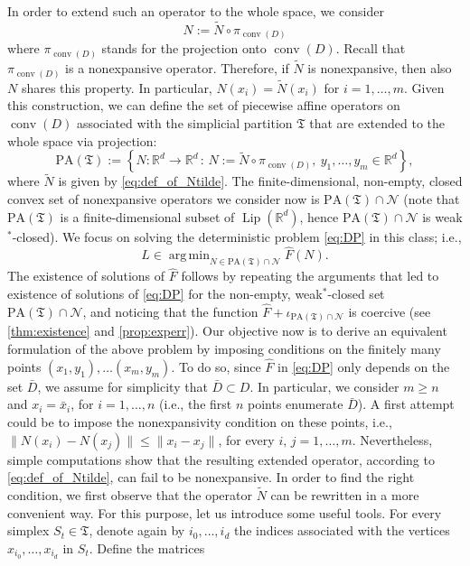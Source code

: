 \documentclass[onefignum,onetabnum]{siamonline250211}
\newcommand{\Lip}{\operatorname{Lip}}
\newcommand{\N}{\mathcal{N}}
\newcommand{\R}{\mathbb{R}}
\newcommand{\conv}{\operatorname{conv}}
\DeclareMathOperator*{\argmin}{arg\,min}
\begin{document}
In order to extend such an operator to the whole space, we consider
$$
N:=\tilde{N}\circ \pi_{\conv(D)}
$$
where $\pi_{\conv(D)}$ stands for the projection onto $\conv(D)$. Recall that $\pi_{\conv(D)}$ is a nonexpansive operator. Therefore, if $\tilde{N}$ is nonexpansive, then also $N$ shares this property. In particular, $N(x_i)=\tilde N (x_i)$ for $i=1,\dots, m$. Given this construction, we can define the set of piecewise affine operators on $\conv(D)$ associated with the simplicial partition $\mathfrak{T}$ that are extended to the whole space via projection:
$$
\mathrm{PA}(\mathfrak{T}):=\left\{N:\R^d\to\R^d  \, : \,  N:=\tilde{N}\circ \pi_{\conv(D)}, \ y_1, \ldots, y_m\in\R^d\right\},
$$
where $\tilde{N}$ is given by \cref{eq:def_of_Ntilde}. The finite-dimensional, non-empty, closed convex set of nonexpansive operators we consider now is $\mathrm{PA}(\mathfrak{T}) \cap \N$ (note that $\mathrm{PA}(\mathfrak{T})$ is a finite-dimensional subset of $\Lip(\R^d)$, hence $\mathrm{PA}(\mathfrak{T}) \cap \N$ is weak$^*$-closed). We focus on solving the deterministic problem \cref{eq:DP} in this class; i.e.,
\begin{equation}\label{eq:PAP}
\tag{PAP}
\widehat{L}\in\argmin_{N\in\mathrm{PA}(\mathfrak{T})\cap\N}\widehat{F}(N).
\end{equation}
The existence of solutions of $\widehat{F}$ follows by repeating the arguments that led to existence of solutions of \cref{eq:DP} for the non-empty, weak$^*$-closed set $\mathrm{PA}(\mathfrak{T}) \cap \N$, and noticing that the function $\widehat{F}+\iota_{\mathrm{PA}(\mathfrak{T})\cap\N}$ is coercive (see \cref{thm:existence} and \cref{prop:experr}). Our objective now is to derive an equivalent formulation of the above problem by imposing conditions on the finitely many points $(x_1, y_1), \ldots (x_m, y_m)$. To do so, since $\widehat{F}$ in \cref{eq:DP} only depends on the set $\bar{D}$, we assume for simplicity that $\bar D\subset D$. In particular, we consider $m \geq n$ and $x_i=\bar{x}_i$, for $i=1,\dots, n$ (i.e., the first $n$ points enumerate $\bar D$). A first attempt could be to impose the nonexpansivity condition on these points, i.e., $\|N(x_i)-N(x_j)\|\leq \|x_i-x_j\|$, for every $i, \, j=1,\ldots,m$. Nevertheless, simple computations show that the resulting extended operator, according to \cref{eq:def_of_Ntilde}, can fail to be nonexpansive. In order to find the right condition, we first observe that the operator $\tilde{N}$ can be rewritten in a more convenient way. For this purpose, let us introduce some useful tools. For every simplex $S_t\in \mathfrak{T}$, denote again by $i_0,\ldots, i_d$ the indices associated with the vertices $x_{i_0}, \ldots, x_{i_d}$ in $S_t$. Define the matrices
\end{document}
